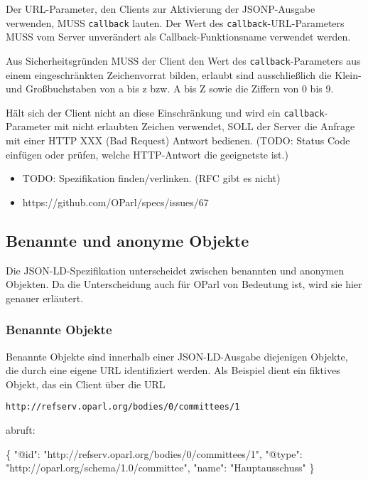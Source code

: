\documentclass[,a4paper]{article}
\newenvironment{Shaded}{}{}
\newcommand{\DataTypeTok}[1]{\textcolor[rgb]{0.56,0.13,0.00}{{#1}}}
\newcommand{\StringTok}[1]{\textcolor[rgb]{0.25,0.44,0.63}{{#1}}}
\newcommand{\NormalTok}[1]{{#1}}
\begin{document}
Der URL-Parameter, den Clients zur Aktivierung der JSONP-Ausgabe
verwenden, MUSS \texttt{callback} lauten. Der Wert des
\texttt{callback}-URL-Parameters MUSS vom Server unverändert als
Callback-Funktionsname verwendet werden.

Aus Sicherheitsgründen MUSS der Client den Wert des
\texttt{callback}-Parameters aus einem eingeschränkten Zeichenvorrat
bilden, erlaubt sind ausschließlich die Klein- und Großbuchstaben von a
bis z bzw. A bis Z sowie die Ziffern von 0 bis 9.

Hält sich der Client nicht an diese Einschränkung und wird ein
\texttt{callback}-Parameter mit nicht erlaubten Zeichen verwendet, SOLL
der Server die Anfrage mit einer HTTP XXX (Bad Request) Antwort
bedienen. (TODO: Status Code einfügen oder prüfen, welche HTTP-Antwort
die geeignetste ist.)

\begin{itemize}
\itemsep1pt\parskip0pt
\item
  TODO: Spezifikation finden/verlinken. (RFC gibt es nicht)
\item
  https://github.com/OParl/specs/issues/67
\end{itemize}

\subsection{Benannte und anonyme
Objekte}\label{benannte-und-anonyme-objekte}

Die JSON-LD-Spezifikation unterscheidet zwischen benannten und anonymen
Objekten. Da die Unterscheidung auch für OParl von Bedeutung ist, wird
sie hier genauer erläutert.

\subsubsection{Benannte Objekte}\label{benannte-objekte}

Benannte Objekte sind innerhalb einer JSON-LD-Ausgabe diejenigen
Objekte, die durch eine eigene URL identifiziert werden. Als Beispiel
dient ein fiktives Objekt, das ein Client über die URL

\begin{verbatim}
http://refserv.oparl.org/bodies/0/committees/1
\end{verbatim}

abruft:

\begin{Shaded}
\begin{Highlighting}[]
\NormalTok{\{}
    \DataTypeTok{"@id"}\NormalTok{: }\StringTok{"http://refserv.oparl.org/bodies/0/committees/1"}\NormalTok{,}
    \DataTypeTok{"@type"}\NormalTok{: }\StringTok{"http://oparl.org/schema/1.0/committee"}\NormalTok{,}
    \DataTypeTok{"name"}\NormalTok{: }\StringTok{"Hauptausschuss"}
\NormalTok{\}}
\end{Highlighting}
\end{Shaded}
\end{document}
